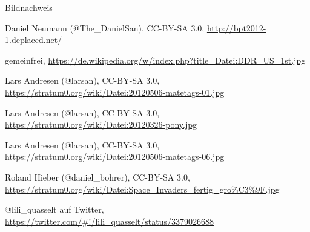 \documentclass[hyperref={pdfpagelabels=false}]{beamer}
\begin{document}
\begin{frame}{Bildnachweis}
    \begin{description}[Folie XX]
        \item[Folie \ref{secbaellebad}] Daniel Neumann (@The\_DanielSan), CC-BY-SA 3.0, \footnotesize\url{http://bpt2012-1.deplaced.net/}\normalsize
        \item[Folie \ref{secddr}] gemeinfrei, \scriptsize\url{https://de.wikipedia.org/w/index.php?title=Datei:DDR\_US\_1st.jpg}\normalsize
        \item[Folie \ref{secmatetags}] Lars Andresen (@larsan), CC-BY-SA 3.0, \footnotesize\url{https://stratum0.org/wiki/Datei:20120506-matetags-01.jpg}\normalsize
        \item[Folie \ref{secpony}] Lars Andresen (@larsan), CC-BY-SA 3.0, \footnotesize\url{https://stratum0.org/wiki/Datei:20120326-pony.jpg}\normalsize
        \item[Folie \ref{secreprap}] Lars Andresen (@larsan), CC-BY-SA 3.0, \footnotesize\url{https://stratum0.org/wiki/Datei:20120506-matetags-06.jpg}\normalsize
        \item[Folie \ref{secinvaders}] Roland Hieber (@daniel\_bohrer), CC-BY-SA 3.0, \scriptsize\url{https://stratum0.org/wiki/Datei:Space\_Invaders\_fertig\_gro\%C3\%9F.jpg}\normalsize
        \item[Folie \ref{secgeschichte}] @lili\_quasselt auf Twitter,
            \footnotesize\url{https://twitter.com/\#!/lili\_quasselt/status/3379026688}\normalsize
    \end{description}
\end{frame}
\end{document}
